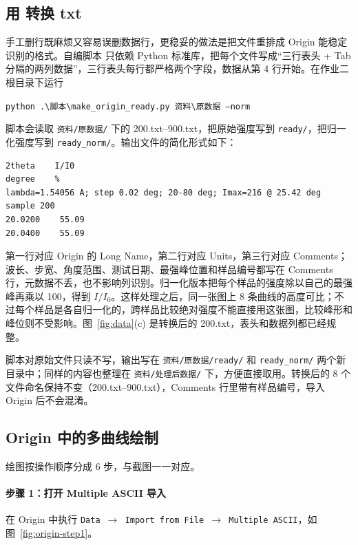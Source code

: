 \subsection{用 \pyA 转换 txt}

手工删行既麻烦又容易误删数据行，更稳妥的做法是把文件重排成 Origin 能稳定识别的格式。自编脚本 \pyA 只依赖 Python 标准库，把每个文件写成“三行表头 + Tab 分隔的两列数据”，三行表头每行都严格两个字段，数据从第 4 行开始。在作业二根目录下运行

\begin{center}
\texttt{python .\textbackslash 脚本\textbackslash make\_origin\_ready.py 资料\textbackslash 原数据 --norm}
\end{center}

脚本会读取 \texttt{资料/原数据/} 下的 200.txt--900.txt，把原始强度写到 \texttt{ready/}，把归一化强度写到 \texttt{ready\_norm/}。输出文件的简化形式如下：

\begin{verbatim}
2theta    I/I0
degree    %
lambda=1.54056 A; step 0.02 deg; 20-80 deg; Imax=216 @ 25.42 deg    sample 200
20.0200    55.09
20.0400    55.09
\end{verbatim}

第一行对应 Origin 的 Long Name，第二行对应 Units，第三行对应 Comments；波长、步宽、角度范围、测试日期、最强峰位置和样品编号都写在 Comments 行，元数据不丢，也不影响列识别。归一化版本把每个样品的强度除以自己的最强峰再乘以 100，得到 $I/I_0$。这样处理之后，同一张图上 8 条曲线的高度可比；不过每个样品是各自归一化的，跨样品比较绝对强度不能直接用这张图，比较峰形和峰位则不受影响。图~\ref{fig:data}(c) 是转换后的 200.txt，表头和数据列都已经规整。

脚本对原始文件只读不写，输出写在 \texttt{资料/原数据/ready/} 和 \texttt{ready\_norm/} 两个新目录中；同样的内容也整理在 \texttt{资料/处理后数据/} 下，方便直接取用。转换后的 8 个文件命名保持不变（200.txt--900.txt），Comments 行里带有样品编号，导入 Origin 后不会混淆。

\subsection{Origin 中的多曲线绘制}

绘图按操作顺序分成 6 步，与截图一一对应。

\paragraph{步骤 1：打开 Multiple ASCII 导入}
在 Origin 中执行 \texttt{Data $\rightarrow$ Import from File $\rightarrow$ Multiple ASCII}，如图~\ref{fig:origin-step1}。


